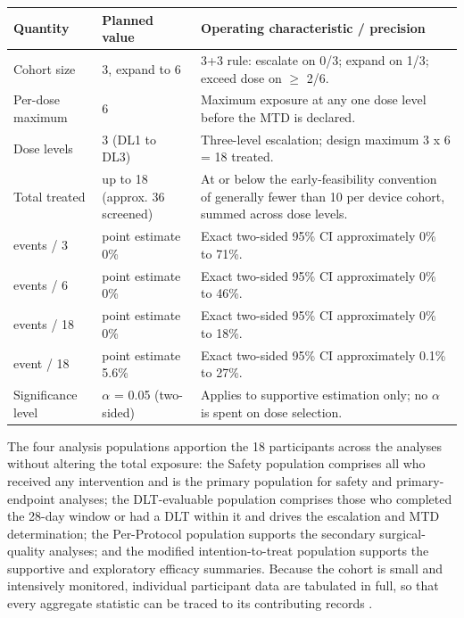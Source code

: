 \noindent\begin{tabularx}{\textwidth}{L{2.8cm} L{3.0cm} Y}
\toprule
\textbf{Quantity} & \textbf{Planned value} & \textbf{Operating characteristic / precision} \\
\midrule
Cohort size & 3, expand to 6 & 3+3 rule: escalate on 0/3; expand on 1/3; exceed dose on $\geq$ 2/6. \\
\addlinespace
Per-dose maximum & 6 & Maximum exposure at any one dose level before the MTD is declared. \\
\addlinespace
Dose levels & 3 (DL1 to DL3) & Three-level escalation; design maximum 3 x 6 = 18 treated. \\
\addlinespace
Total treated & up to 18 (approx. 36 screened) & At or below the early-feasibility convention of generally fewer than 10 per device cohort, summed across dose levels. \\
 events / 3 & point estimate 0\% & Exact two-sided 95\% CI approximately 0\% to 71\%. \\
 events / 6 & point estimate 0\% & Exact two-sided 95\% CI approximately 0\% to 46\%. \\
 events / 18 & point estimate 0\% & Exact two-sided 95\% CI approximately 0\% to 18\%. \\
 event / 18 & point estimate 5.6\% & Exact two-sided 95\% CI approximately 0.1\% to 27\%. \\
\addlinespace
Significance level & $\alpha$ = 0.05 (two-sided) & Applies to supportive estimation only; no $\alpha$ is spent on dose selection. \\
\bottomrule
\end{tabularx}

The four analysis populations apportion the 18 participants across the analyses
without altering the total exposure: the Safety population comprises all who received
any intervention and is the primary population for safety and primary-endpoint
analyses; the DLT-evaluable population comprises those who completed the 28-day
window or had a DLT within it and drives the escalation and MTD determination; the
Per-Protocol population supports the secondary surgical-quality analyses; and the
modified intention-to-treat population supports the supportive and exploratory
efficacy summaries. Because the cohort is small and intensively monitored,
individual participant data are tabulated in full, so that every aggregate statistic
can be traced to its contributing records \cite{ichpaistduni}.

